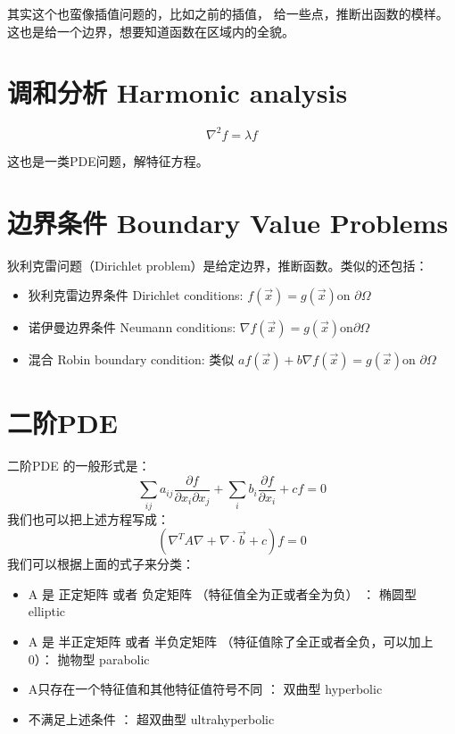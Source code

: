 \documentclass[
]{book}
\providecommand{\tightlist}{%
  \setlength{\itemsep}{0pt}\setlength{\parskip}{0pt}}
\begin{document}
其实这个也蛮像插值问题的，比如之前的插值， 给一些点，推断出函数的模样。这也是给一个边界，想要知道函数在区域内的全貌。

\hypertarget{ux8c03ux548cux5206ux6790-harmonic-analysis}{%
\section{调和分析 Harmonic analysis}\label{ux8c03ux548cux5206ux6790-harmonic-analysis}}

\[\nabla^2f = \lambda f\]

这也是一类PDE问题，解特征方程。

\hypertarget{ux8fb9ux754cux6761ux4ef6-boundary-value-problems}{%
\section{边界条件 Boundary Value Problems}\label{ux8fb9ux754cux6761ux4ef6-boundary-value-problems}}

狄利克雷问题（Dirichlet problem）是给定边界，推断函数。类似的还包括：

\begin{itemize}
\tightlist
\item
  狄利克雷边界条件 Dirichlet conditions: \(f(\vec{x}) = g(\vec{x}) \text{on } \partial \Omega\)
\item
  诺伊曼边界条件 Neumann conditions: \(\nabla f(\vec{x}) = g(\vec{x}) \text{on} \partial \Omega\)
\item
  混合 Robin boundary condition: 类似 \(af(\vec{x}) + b\nabla f(\vec{x})=g(\vec{x}) {\text{on }}\partial \Omega\)
\end{itemize}

\hypertarget{ux4e8cux9636pde}{%
\section{二阶PDE}\label{ux4e8cux9636pde}}

二阶PDE 的一般形式是：
\[
\sum_{ij} a_{ij} \frac{\partial f} {\partial x_i \partial x_j} + \sum_i b_i \frac{\partial f}{\partial x_i} + cf = 0
\]
我们也可以把上述方程写成：
\[
(\nabla^T A \nabla + \nabla \cdot \vec{b} + c) f = 0
\]
我们可以根据上面的式子来分类：

\begin{itemize}
\tightlist
\item
  A 是 正定矩阵 或者 负定矩阵 （特征值全为正或者全为负） ： 椭圆型 elliptic
\item
  A 是 半正定矩阵 或者 半负定矩阵 （特征值除了全正或者全负，可以加上0）： 抛物型 parabolic
\item
  A只存在一个特征值和其他特征值符号不同 ： 双曲型 hyperbolic
\item
  不满足上述条件 ： 超双曲型 ultrahyperbolic
\end{itemize}
\end{document}
